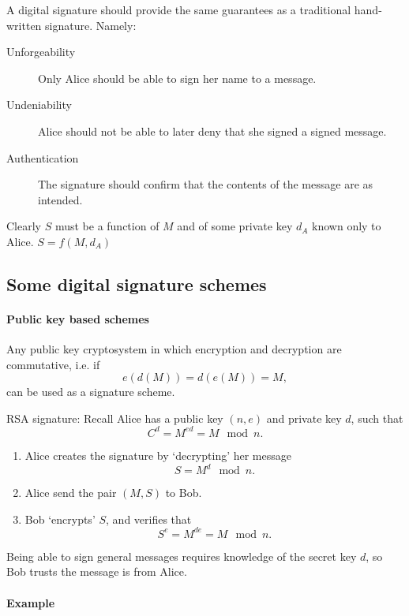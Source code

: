 \documentclass[a4paper, 11pt, openany]{book}
\numberwithin{equation}{section}
\theoremstyle{plain}
\theoremstyle{definition}
\begin{document}
A digital signature should provide the same guarantees as a traditional hand-written signature. Namely:
\begin{description}
\item[Unforgeability] Only Alice should be able to sign her name to a message.

\item[Undeniability] Alice should not be able to later deny that she signed a signed message.

\item[Authentication] The signature should confirm that the contents of the message are as intended.
\end{description}

Clearly $S$ must be a function of $M$ and of some private key $d_A$ known only to Alice. $S = f(M,d_A)$ 


\subsection{Some digital signature schemes}

\paragraph{Public key based schemes}


Any public key cryptosystem in which encryption and decryption are commutative, i.e. if 
\[
    e(d(M)) = d(e(M)) = M,
\]
can be used as a signature scheme. 

RSA signature: Recall Alice has a public key $(n,e)$ and private key $d$, such that    
\[
    C^d = M^{ed} = M \mod n.
\]
\begin{enumerate}
    \item Alice creates the signature by ‘decrypting’ her message  
    \[
    	S = M^d \mod n.
    \]
    
    \item Alice send the pair $(M,S)$ to Bob.
    
    \item Bob ‘encrypts’ $S$, and verifies that
    \[
        S^e = M^{de} = M \mod n.
    \]
\end{enumerate}

Being able to sign general messages requires knowledge of the secret key $d$, so Bob trusts the message is from Alice.



\paragraph{Example}
\end{document}
